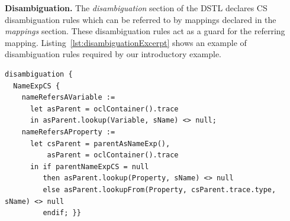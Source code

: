 \documentclass{llncs}
\begin{document}
\textbf{Disambiguation.}
The \textit{disambiguation} section of the DSTL declares CS disambiguation rules which can be referred to by mappings declared in the \textit{mappings} section. These disambiguation rules act as a guard for the referring mapping. %
Listing~\ref{lst:disambiguationExcerpt} shows an example of disambiguation rules required by our introductory example.

\begin{lstlisting}[caption=CS disambiguation rules, label=lst:disambiguationExcerpt, language=CS2AS]
disambiguation {
  NameExpCS { 
    nameRefersAVariable := 
      let asParent = oclContainer().trace
      in asParent.lookup(Variable, sName) <> null;
    nameRefersAProperty := 
      let csParent = parentAsNameExp(),
          asParent = oclContainer().trace
      in if parentNameExpCS = null
         then asParent.lookup(Property, sName) <> null
         else asParent.lookupFrom(Property, csParent.trace.type, sName) <> null
         endif; }}
\end{lstlisting}


\end{document}

